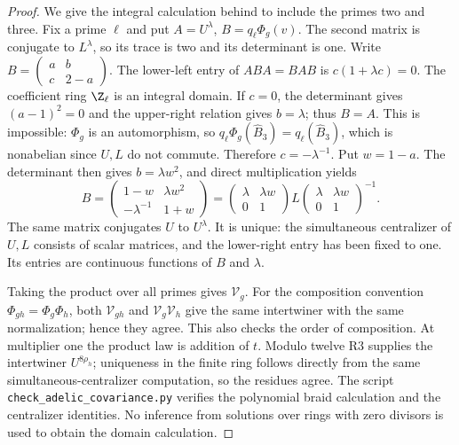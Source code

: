 \begin{proof}
We give the integral calculation behind
\citet[Section 4, Lemmas 4.1--4.3]{LitMarin2008} to include
the primes two and three. Fix a prime $\ell$ and put
$A=U^{\lambda}$, $B=q_\ell\Phi_g(v)$.
The second matrix is conjugate to $L^{\lambda}$, so its trace
is two and its determinant is one. Write
$B=\left(\begin{smallmatrix}a&b\\c&2-a\end{smallmatrix}\right)$.
The lower-left entry of $ABA=BAB$ is
$c(1+\lambda c)=0$. The coefficient ring $\Z_\ell$ is an
integral domain. If $c=0$, the determinant gives $(a-1)^2=0$
and the upper-right relation gives $b=\lambda$; thus $B=A$.
This is impossible: $\Phi_g$ is an automorphism, so
$q_\ell\Phi_g(\widehat B_3)=q_\ell(\widehat B_3)$,
which is nonabelian since $U,L$ do not commute.
Therefore $c=-\lambda^{-1}$. Put $w=1-a$. The determinant
then gives $b=\lambda w^2$, and direct multiplication yields
\[
 B=\begin{pmatrix}1-w&\lambda w^2\\
             -\lambda^{-1}&1+w\end{pmatrix}
 =\begin{pmatrix}\lambda&\lambda w\\0&1\end{pmatrix}
       L
  \begin{pmatrix}\lambda&\lambda w\\0&1\end{pmatrix}^{-1}.
\]
The same matrix conjugates $U$ to $U^{\lambda}$. It is unique:
the simultaneous centralizer of $U,L$ consists of scalar
matrices, and the lower-right entry has been fixed to one.
Its entries are continuous functions of $B$ and $\lambda$.

Taking the product over all primes gives $\mathcal V_g$.
For the composition convention $\Phi_{gh}=\Phi_g\Phi_h$,
both $\mathcal V_{gh}$ and $\mathcal V_g\mathcal V_h$
give the same intertwiner with the same normalization; hence
they agree. This also checks the order of composition.
At multiplier one the product law is addition of $t$.
Modulo twelve R3 supplies the intertwiner $U^{8\rho_h}$;
uniqueness in the finite ring follows directly from the same
simultaneous-centralizer computation, so the residues agree.
The script \texttt{check\_adelic\_covariance.py} verifies the
polynomial braid calculation and the centralizer identities.
No inference from solutions over rings with zero divisors is
used to obtain the domain calculation.
\end{proof}

